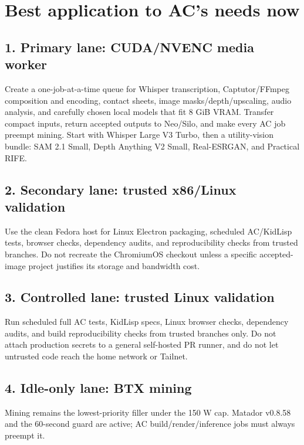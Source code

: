 \documentclass[11pt,letterpaper]{article}
\begin{document}
\section{Best application to AC's needs now}

\subsection{1. Primary lane: CUDA/NVENC media worker}

Create a one-job-at-a-time queue for Whisper transcription, Captutor/FFmpeg composition and encoding, contact sheets, image masks/depth/upscaling, audio analysis, and carefully chosen local models that fit 8 GiB VRAM. Transfer compact inputs, return accepted outputs to Neo/Silo, and make every AC job preempt mining. Start with Whisper Large V3 Turbo, then a utility-vision bundle: SAM 2.1 Small, Depth Anything V2 Small, Real-ESRGAN, and Practical RIFE.

\subsection{2. Secondary lane: trusted x86/Linux validation}

Use the clean Fedora host for Linux Electron packaging, scheduled AC/KidLisp tests, browser checks, dependency audits, and reproducibility checks from trusted branches. Do not recreate the ChromiumOS checkout unless a specific accepted-image project justifies its storage and bandwidth cost.

\subsection{3. Controlled lane: trusted Linux validation}

Run scheduled full AC tests, KidLisp specs, Linux browser checks, dependency audits, and build reproducibility checks from trusted branches only. Do not attach production secrets to a general self-hosted PR runner, and do not let untrusted code reach the home network or Tailnet.

\subsection{4. Idle-only lane: BTX mining}

Mining remains the lowest-priority filler under the 150 W cap. Matador v0.8.58 and the 60-second guard are active; AC build/render/inference jobs must always preempt it.
\end{document}
